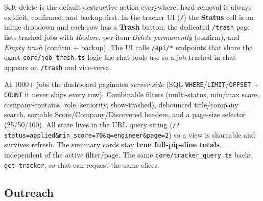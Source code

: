 \documentclass[11pt,letterpaper]{article}
\newcommand{\tool}[1]{\texttt{#1}}
\newcommand{\fpath}[1]{\texttt{#1}}
\begin{document}
\begin{tipbox}
Soft-delete is the default destructive action everywhere; hard removal is always explicit, confirmed, and backup-first. In the tracker UI (\texttt{/}) the \textbf{Status} cell is an inline dropdown and each row has a \textbf{Trash} button; the dedicated \texttt{/trash} page lists trashed jobs with \emph{Restore}, per-item \emph{Delete permanently} (confirm), and \emph{Empty trash} (confirm + backup). The UI calls \texttt{/api/*} endpoints that share the exact \fpath{core/job\_trash.ts} logic the chat tools use \textemdash{} so a job trashed in chat appears on \texttt{/trash} and vice-versa.
\end{tipbox}

\begin{tipbox}
At 1000+ jobs the dashboard paginates \emph{server-side} (SQL \texttt{WHERE}/\texttt{LIMIT}/\texttt{OFFSET} + \texttt{COUNT} \textemdash{} it never ships every row). Combinable filters (multi-status, min/max score, company-contains, role, seniority, show-trashed), debounced title/company search, sortable Score/Company/Discovered headers, and a page-size selector (25/50/100). All state lives in the URL query string (\texttt{/?status=applied\&min\_score=70\&q=engineer\&page=2}) so a view is shareable and survives refresh. The summary cards stay \textbf{true full-pipeline totals}, independent of the active filter/page. The same \fpath{core/tracker\_query.ts} backs \tool{get\_tracker}, so chat can request the same slices.
\end{tipbox}

\subsection*{Outreach}
\end{document}
